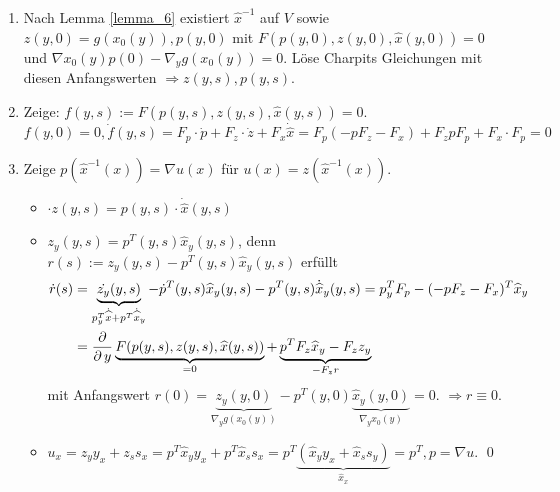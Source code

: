 	\begin{enumerate}[1.]
		\item Nach Lemma \eqref{lemma_6}  existiert $\widehat{x}^{-1}$ auf $V$ sowie $z(y,0) = g(x_0(y)),p(y,0)$ mit $F(p(y,0),z(y,0),\widehat{x}(y,0)) = 0$ und $\nabla x_0 (y) p(0) - \nabla_y g(x_0(y)) = 0$. Löse Charpits Gleichungen mit diesen Anfangswerten $\Rightarrow z(y,s),p(y,s)$.
		\item Zeige: $f(y,s) := F(p(y,s),z(y,s),\widehat{x}(y,s)) = 0$. \\
			$f(y,0) = 0, \dot{f}(y,s) = F_p \cdot \dot{p} + F_z \cdot \dot{z} + F_x \dot{\widehat{x}} = F_p(-pF_z - F_x) + F_zpF_p + F_x \cdot F_p = 0$
		\item Zeige $p(\widehat{x}^{-1}(x)) = \nabla u(x)$ für $u(x) = z(\widehat{x}^{-1}(x))$.  \begin{itemize}
				\item $\cdot{z}(y,s) = p(y,s) \cdot \dot{\widehat{x}}(y,s)$
				\item $z_y(y,s) = p^T(y,s) \widehat{x}_y(y,s)$, denn $r(s) := z_y(y,s) - p^T(y,s) \widehat{x}_y (y,s)$ erfüllt
				\begin{equation}
				\begin{aligned}
					\dot{r}(s) &= \underbrace{\dot{z_y}(y,s)}_{p^T_y \dot{\widehat{x}} + p^T \dot{\widehat{x}}_y} - \dot{p}^T(y,s) \widehat{x}_y(y,s) - p^T(y,s) \dot{\widehat{x}}_y(y,s) = p_y^T F_p - (-pF_z - F_x)^T \widehat{x}_y \\ \notag
					&= \frac{\operatorname{\partial}}{\operatorname{\partial} y} \underbrace{F(p(y,s),z(y,s),\widehat{x}(y,s))}_{=0} + \underbrace{p^T F_z \widehat{x}_y - F_z z_y}_{-F_z r}
				\end{aligned}
				\end{equation} 
				mit Anfangswert $r(0) = \underbrace{z_y(y,0)}_{\nabla_y g(x_0(y))} - p^T(y,0) \underbrace{\widehat{x}_y(y,0)}_{\nabla_y x_0(y)} = 0$. $\Rightarrow r \equiv 0$.
				\item $u_x = z_y y_x + z_s s_x = p^T \widehat{x}_y y_x + p^T \widehat{x}_s s_x = p^T \underbrace{(\widehat{x}_y y_x + \widehat{x}_s s_y)}_{\widehat{x}_x} = p^T, p = \nabla u$. \qed
			\end{itemize}
	\end{enumerate}

